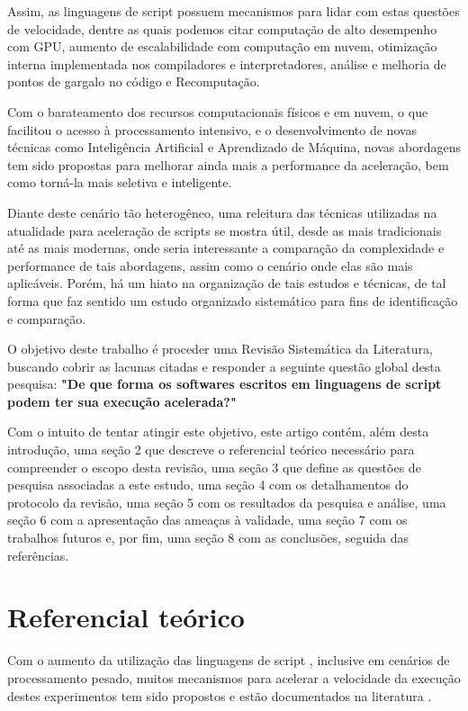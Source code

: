 \documentclass[sigconf]{acmart}
\begin{document}
Assim, as linguagens de script possuem mecanismos para lidar com estas questões de velocidade, dentre as quais podemos citar computação de alto desempenho com GPU, aumento de escalabilidade com computação em nuvem, otimização interna implementada nos compiladores e interpretadores, análise e melhoria de pontos de gargalo no código e Recomputação.

Com o barateamento dos recursos computacionais físicos e em nuvem, o que facilitou o acesso à processamento intensivo, e o desenvolvimento de novas técnicas como Inteligência Artificial e Aprendizado de Máquina, novas abordagens tem sido propostas para melhorar ainda mais a performance da aceleração, bem como torná-la mais seletiva e inteligente.

Diante deste cenário tão heterogêneo, uma releitura das técnicas utilizadas na atualidade para aceleração de scripts se mostra útil, desde as mais tradicionais até as mais modernas, onde seria interessante a comparação da complexidade e performance de tais abordagens, assim como o cenário onde elas são mais aplicáveis. Porém, há um hiato na organização de tais estudos e técnicas, de tal forma que faz sentido um estudo organizado sistemático para fins de identificação e comparação.

O objetivo deste trabalho é proceder uma Revisão Sistemática da Literatura, buscando cobrir as lacunas citadas e responder a seguinte questão global desta pesquisa: \textbf{"De que forma os softwares escritos em linguagens de script podem ter sua execução acelerada?"} 

Com o intuito de tentar atingir este objetivo, este artigo contém, além desta introdução, uma seção 2 que descreve o referencial teórico necessário para compreender o escopo desta revisão, uma seção 3 que define as questões de pesquisa associadas a este estudo, uma seção 4 com os detalhamentos do protocolo da revisão, uma seção 5 com os resultados da pesquisa e análise, uma seção 6 com a apresentação das ameaças à validade, uma seção 7 com os trabalhos futuros e, por fim, uma seção 8 com as conclusões, seguida das referências.


\section{Referencial teórico}
Com o aumento da utilização das linguagens de script \cite{IEEESpectrum:2020}\cite{GitHubOctoverse:2020}\cite{StackOverflow:2020}\cite{TIOBEIndex:2020}\cite{PYPL:2020}, inclusive em cenários de processamento pesado, muitos mecanismos para acelerar a velocidade da execução destes experimentos tem sido propostos e estão documentados na literatura \cite{nguyen2013cachetor}\cite{della2015performance}\cite{fitzpatrick2004distributed}.
\end{document}
